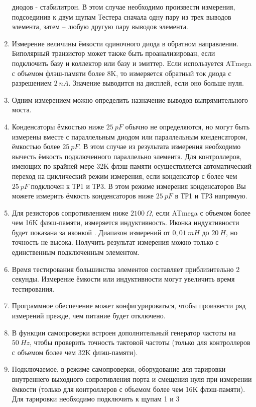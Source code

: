 \begin{enumerate}
диодов - стабилитрон. В этом случае необходимо произвести измерения, подсоединив к двум щупам Тестера сначала 
одну пару из трех выводов элемента, затем – любую другую пару выводов элемента. 
\item Измерение величины ёмкости одиночного диода в обратном направлении. Биполярный транзистор может также быть 
проанализирован, если подключить базу и коллектор или базу и эмиттер.
Если используется ATmega с объемом флэш-памяти более 8K, то измеряется обратный ток диода с разрешением \(2~nA\).
Значение выводится на дисплей, если оно больше нуля. 
\item Одним измерением можно определить назначение выводов выпрямительного моста.
\item Конденсаторы ёмкостью ниже \(25~pF\) обычно не определяются, но могут быть измерены вместе с параллельным диодом 
или параллельным конденсатором, ёмкостью более \(25~pF\). В этом случае из результата измерения необходимо вычесть 
ёмкость подключенного параллельно элемента.
Для контроллеров, имеющих по крайней мере 32K флэш-памяти осуществляется автоматический переход на циклический
режим измерения, если конденсатор с более чем \(25~pF\) подключен к ТР1 и ТР3. В этом режиме измерения конденсаторов
Вы можете измерить ёмкость конденсаторов ниже \(25~pF\) в ТР1 и ТР3 напрямую.
\item Для резисторов сопротивлением ниже \(2100~\Omega\), если ATmega с объемом более чем 16K флэш-памяти, измеряется индуктивность. 
Иконка индуктивности \mbox{\electricL} будет показана за иконкой \mbox{\electricR}.
Диапазон измерений от  \(0,01~mH\) до \(20~H\), но точность не высока. Получить результат измерения можно только с 
единственным подключенным элементом.
\item Время тестирования большинства элементов составляет приблизительно 2 секунды. Измерение ёмкости или индуктивности 
могут увеличить время тестирования.
\item Программное обеспечение может конфигурироваться, чтобы произвести ряд измерений прежде, чем питание будет 
отключено.
\item В функции самопроверки встроен дополнительный генератор частоты на \(50~Hz\), чтобы проверить точность тактовой 
частоты (только для контроллеров с объемом более чем 32K флэш-памяти).
\item Подключаемое, в режиме самопроверки, оборудование для тарировки внутреннего выходного сопротивления порта и 
смещения нуля при измерении ёмкости (только для контроллеров с объемом более чем 16K флэш-памяти). 
Для тарировки необходимо подключить к щупам 1 и 3 

\end{enumerate}
